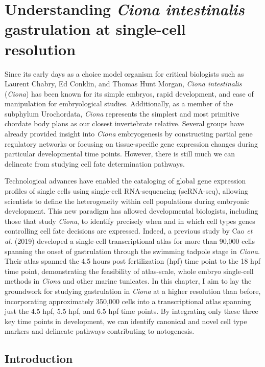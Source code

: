 \chapter{Understanding \textit{Ciona intestinalis} gastrulation at single-cell resolution}

Since its early days as a choice model organism for critical biologists such as Laurent Chabry, Ed Conklin, and Thomas Hunt Morgan, \textit{Ciona intestinalis} (\textit{Ciona}) has been known for its simple embryos, rapid development, and ease of manipulation for embryological studies. Additionally, as a member of the subphylum Urochordata, \textit{Ciona} represents the simplest and most primitive chordate body plans as our closest invertebrate relative. Several groups have already provided insight into \textit{Ciona} embryogenesis by constructing partial gene regulatory networks or focusing on tissue-specific gene expression changes during particular developmental time points. However, there is still much we can delineate from studying cell fate determination pathways. 

Technological advances have enabled the cataloging of global gene expression profiles of single cells using single-cell RNA-sequencing (scRNA-seq), allowing scientists to define the heterogeneity within cell populations during embryonic development. This new paradigm has allowed developmental biologists, including those that study \textit{Ciona}, to identify precisely when and in which cell types genes controlling cell fate decisions are expressed. Indeed, a previous study by Cao \textit{et al.} (2019) developed a single-cell transcriptional atlas for more than 90,000 cells spanning the onset of gastrulation through the swimming tadpole stage in \textit{Ciona}. Their atlas spanned the 4.5 hours post fertilization (hpf) time point to the 18 hpf time point, demonstrating the feasibility of atlas-scale, whole embryo single-cell methods in \textit{Ciona} and other marine tunicates. In this chapter, I aim to lay the groundwork for studying gastrulation in \textit{Ciona} at a higher resolution than before, incorporating approximately 350,000 cells into a transcriptional atlas spanning just the 4.5 hpf, 5.5 hpf, and 6.5 hpf time points. By integrating only these three key time points in development, we can identify canonical and novel cell type markers and delineate pathways contributing to notogenesis.

\section{Introduction}

